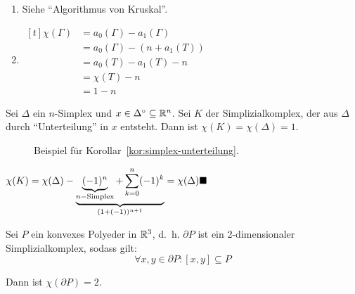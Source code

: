 \begin{beweis}\leavevmode
    \begin{enumerate}[label=\alph*),ref=\theplaindefinition.\alph*]
        \item Siehe \enquote{Algorithmus von Kruskal}.
        \item $\begin{aligned}[t]\chi(\Gamma) &= a_0(\Gamma) - a_1(\Gamma)\\
                                        &= a_0(\Gamma) - (n+a_1(T))\\
                                        &= a_0(T) - a_1(T) - n\\
                                        &= \chi(T) - n\\
                                        &= 1-n
              \end{aligned}$
    \end{enumerate}
\end{beweis}

\begin{korollar}\label{kor:simplex-unterteilung}
    Sei $\Delta$ ein $n$-Simplex und $x \in \Delta^\circ \subseteq \mathbb{R}^n$.
    Sei $K$ der Simplizialkomplex, der aus $\Delta$ durch 
    \enquote{Unterteilung} in $x$ entsteht. Dann ist $\chi(K) = \chi(\Delta) = 1$.
\end{korollar}

\begin{figure}[ht]
    \centering
    \subfloat[$K$]{
        \parbox{4cm}{\centering}
        \label{fig:topology-simplizial-complex-k}
    }%
    \label{fig:korollar-beispiel}
    \caption{Beispiel für Korollar~\ref{kor:simplex-unterteilung}.}
\end{figure}

\begin{beweis}
    $\chi(K) = \chi(\Delta) - \underbrace{\underbrace{(-1)^n}_{n-\text{Simplex}} + \sum_{k=0}^n (-1)^k}_{(1+(-1))^{n+1}} = \chi(\Delta) \qed$
\end{beweis}

\begin{satz}
    Sei $P$ ein konvexes Polyeder in $\mathbb{R}^3$, d.~h. $\partial P$ ist
    ein 2-dimensionaler Simplizialkomplex, sodass gilt:
    \[\forall x,y \in \partial P: [x,y] \subseteq P\]

    Dann ist $\chi(\partial P) = 2$.
\end{satz}

